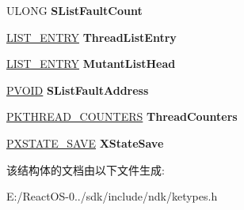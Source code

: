 \begin{DoxyCompactItemize}
\begin{tabbing}
\end{tabbing}\item 
\mbox{\label{struct___k_t_h_r_e_a_d_a3b85bff217b465eac12d6af234f26f69}} 
U\+L\+O\+NG {\bfseries S\+List\+Fault\+Count}
\item 
\mbox{\label{struct___k_t_h_r_e_a_d_a98e4a9f44433ea2b2ab3bc9c7f936e36}} 
\hyperlink{struct___l_i_s_t___e_n_t_r_y}{L\+I\+S\+T\+\_\+\+E\+N\+T\+RY} {\bfseries Thread\+List\+Entry}
\item 
\mbox{\label{struct___k_t_h_r_e_a_d_ac28b76a3a94887dc573aada8fd192a16}} 
\hyperlink{struct___l_i_s_t___e_n_t_r_y}{L\+I\+S\+T\+\_\+\+E\+N\+T\+RY} {\bfseries Mutant\+List\+Head}
\item 
\mbox{\label{struct___k_t_h_r_e_a_d_a808494d60e30a79d9ff56223e3aa7dfb}} 
\hyperlink{interfacevoid}{P\+V\+O\+ID} {\bfseries S\+List\+Fault\+Address}
\item 
\mbox{\label{struct___k_t_h_r_e_a_d_abe6cc8bc450849e1d8e7420596a5383d}} 
\hyperlink{struct___k_t_h_r_e_a_d___c_o_u_n_t_e_r_s}{P\+K\+T\+H\+R\+E\+A\+D\+\_\+\+C\+O\+U\+N\+T\+E\+RS} {\bfseries Thread\+Counters}
\item 
\mbox{\label{struct___k_t_h_r_e_a_d_aafbca1d46cc09631920605fe2a768436}} 
\hyperlink{struct___x_s_t_a_t_e___s_a_v_e}{P\+X\+S\+T\+A\+T\+E\+\_\+\+S\+A\+VE} {\bfseries X\+State\+Save}
\end{DoxyCompactItemize}


该结构体的文档由以下文件生成\+:\begin{DoxyCompactItemize}
\item 
E\+:/\+React\+O\+S-\/0../sdk/include/ndk/ketypes.\+h\end{DoxyCompactItemize}
